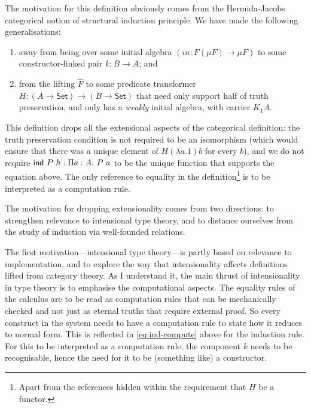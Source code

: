 \documentclass{amsart}
\newcommand{\Set}{\mathsf{Set}}
\newcommand{\inn}{\mathit{in}}
\begin{document}
The motivation for this definition obviously comes from the
Hermida-Jacobs categorical notion of structural induction principle.
We have made the following generalisations:
\begin{enumerate}
\item away from being over some initial algebra $(\inn : F (\mu F) \to
  \mu F)$ to some constructor-linked pair $k : B \to A$; and
\item from the lifting $\hat{F}$ to some predicate transformer $H : (A
  \to \Set) \to (B \to \Set)$ that need only support half of truth
  preservation, and only has a \emph{weakly} initial algebra, with
  carrier $K_1 A$.
\end{enumerate}
This definition drops all the extensional aspects of the categorical
definition: the truth preservation condition is not required to be an
isomorphism (which would ensure that there was a unique element of
$H(\lambda a. 1)b$ for every $b$), and we do not require $\mathsf{ind}\ P\ h :
\Pi a : A.\ P\ a$ to be the unique function that supports the equation
above. The only reference to equality in the definition\footnote{Apart
  from the references hidden within the requirement that $H$ be a
  functor.} is to be interpreted as a computation rule.

The motivation for dropping extensionality comes from two directions:
to strengthen relevance to intensional type theory, and to distance
ourselves from the study of induction via well-founded relations.

The first motivation---intensional type theory---is partly based on
relevance to implementation, and to explore the way that
intensionality affects definitions lifted from category theory. As I
understand it, the main thrust of intensionality in type theory is to
emphasise the computational aspects. The equality rules of the
calculus are to be read as computation rules that can be mechanically
checked and not just as eternal truths that require external proof. So
every construct in the system needs to have a computation rule to
state how it reduces to normal form. This is reflected in
\autoref{eq:ind-compute} above for the induction rule. For this to be
interpreted as a computation rule, the component $k$ needs to be
recognisable, hence the need for it to be (something like) a
constructor.
\end{document}
